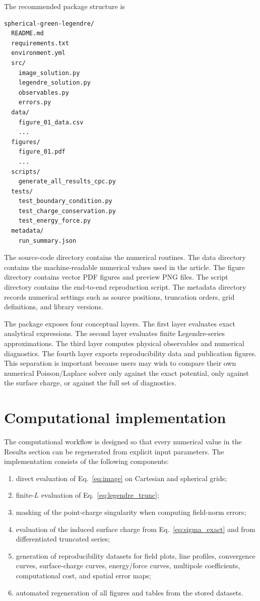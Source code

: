 \documentclass[preprint,12pt]{elsarticle}
\begin{document}
The recommended package structure is
\begin{lstlisting}[language=bash,basicstyle=\ttfamily\small,frame=single]
spherical-green-legendre/
  README.md
  requirements.txt
  environment.yml
  src/
    image_solution.py
    legendre_solution.py
    observables.py
    errors.py
  data/
    figure_01_data.csv
    ...
  figures/
    figure_01.pdf
    ...
  scripts/
    generate_all_results_cpc.py
  tests/
    test_boundary_condition.py
    test_charge_conservation.py
    test_energy_force.py
  metadata/
    run_summary.json
\end{lstlisting}
The source-code directory contains the numerical routines. The data directory contains the machine-readable numerical values used in the article. The figure directory contains vector PDF figures and preview PNG files. The script directory contains the end-to-end reproduction script. The metadata directory records numerical settings such as source positions, truncation orders, grid definitions, and library versions.

The package exposes four conceptual layers. The first layer evaluates exact analytical expressions. The second layer evaluates finite Legendre-series approximations. The third layer computes physical observables and numerical diagnostics. The fourth layer exports reproducibility data and publication figures. This separation is important because users may wish to compare their own numerical Poisson/Laplace solver only against the exact potential, only against the surface charge, or against the full set of diagnostics.


\section{Computational implementation}\label{sec:implementation}

The computational workflow is designed so that every numerical value in the Results section can be regenerated from explicit input parameters. The implementation consists of the following components:
\begin{enumerate}[label=(\roman*)]
    \item direct evaluation of Eq.~\eqref{eq:image} on Cartesian and spherical grids;
    \item finite-$L$ evaluation of Eq.~\eqref{eq:legendre_trunc};
    \item masking of the point-charge singularity when computing field-norm errors;
    \item evaluation of the induced surface charge from Eq.~\eqref{eq:sigma_exact} and from differentiated truncated series;
    \item generation of reproducibility datasets for field plots, line profiles, convergence curves, surface-charge curves, energy/force curves, multipole coefficients, computational cost, and spatial error maps;
    \item automated regeneration of all figures and tables from the stored datasets.
\end{enumerate}
\end{document}
